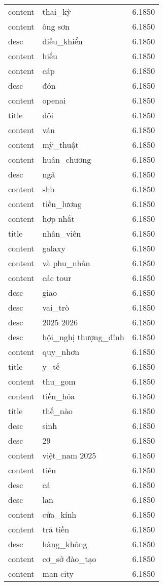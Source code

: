 \documentclass{article}
\begin{document}
\begin{tabular}{lll}
content & thai\_kỳ & 6.1850\\
content & ông sơn & 6.1850\\
desc & điều\_khiển & 6.1850\\
content & hiếu & 6.1850\\
content & cáp & 6.1850\\
desc & đón & 6.1850\\
content & openai & 6.1850\\
title & đôi & 6.1850\\
content & ván & 6.1850\\
content & mỹ\_thuật & 6.1850\\
content & huân\_chương & 6.1850\\
desc & ngã & 6.1850\\
content & shb & 6.1850\\
content & tiền\_lương & 6.1850\\
content & hợp nhất & 6.1850\\
title & nhân\_viên & 6.1850\\
content & galaxy & 6.1850\\
content & và phu\_nhân & 6.1850\\
content & các tour & 6.1850\\
desc & giao & 6.1850\\
desc & vai\_trò & 6.1850\\
desc & 2025 2026 & 6.1850\\
desc & hội\_nghị thượng\_đỉnh & 6.1850\\
content & quy\_nhơn & 6.1850\\
title & y\_tế & 6.1850\\
content & thu\_gom & 6.1850\\
content & tiến\_hóa & 6.1850\\
title & thế\_nào & 6.1850\\
desc & sinh & 6.1850\\
desc & 29 & 6.1850\\
content & việt\_nam 2025 & 6.1850\\
content & tiên & 6.1850\\
desc & cá & 6.1850\\
desc & lan & 6.1850\\
content & cửa\_kính & 6.1850\\
content & trả tiền & 6.1850\\
desc & hàng\_không & 6.1850\\
content & cơ\_sở đào\_tạo & 6.1850\\
content & man city & 6.1850\\

\end{tabular}
\end{document}
